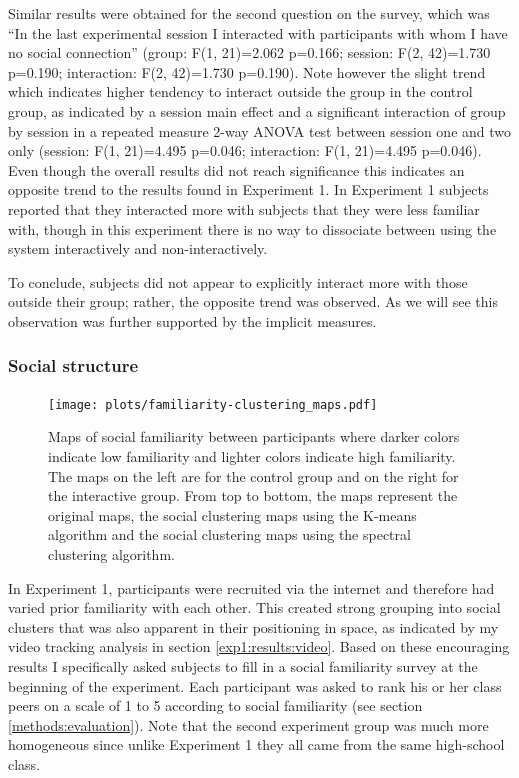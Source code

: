 \documentclass[a4paper,11pt]{article}
\begin{document}
{Similar results were obtained for the second question on the survey, which was ``In the last experimental session I interacted with participants with whom I have no social connection'' (group: F(1, 21)=2.062 p=0.166; session: F(2, 42)=1.730 p=0.190; interaction: F(2, 42)=1.730 p=0.190).
Note however the slight trend which indicates higher tendency to interact outside the group in the control group, as indicated by a session main effect and a significant interaction of group by session in a repeated measure 2-way ANOVA test between session one and two only (session: F(1, 21)=4.495 p=0.046; interaction: F(1, 21)=4.495 p=0.046).
Even though the overall results did not reach significance this indicates an opposite trend to the results found in Experiment 1.
In Experiment 1 subjects reported that they interacted more with subjects that they were less familiar with, though in this experiment there is no way to dissociate between using the system interactively and non-interactively.

To conclude, subjects did not appear to explicitly interact more with those outside their group;
rather, the opposite trend was observed.
As we will see this observation was further supported by the implicit measures.

\subsubsection{Social structure}\label{results:social_structure}

\begin{figure}[!htb]
    \centering
    \texttt{[image: plots/familiarity-clustering\_maps.pdf]}
    \caption{Maps of social familiarity between participants where darker colors indicate low familiarity and lighter colors indicate high familiarity. The maps on the left are for the control group and on the right for the interactive group. From top to bottom, the maps represent the original maps, the social clustering maps using the K-means algorithm and the social clustering maps using the spectral clustering algorithm.}\label{plot:familiarity-clustering_maps}
\end{figure}

In Experiment 1, participants were recruited via the internet and therefore had varied prior familiarity with each other.
This created strong grouping into social clusters that was also apparent in their positioning in space, as indicated by my video tracking analysis in section \ref{exp1:results:video}.
Based on these encouraging results I specifically asked subjects to fill in a social familiarity survey at the beginning of the experiment.
Each participant was asked to rank his or her class peers on a scale of 1 to 5 according to social familiarity (see section \ref{methods:evaluation}).
Note that the second experiment group was much more homogeneous since unlike Experiment 1 they all came from the same high-school class.

}
\end{document}
